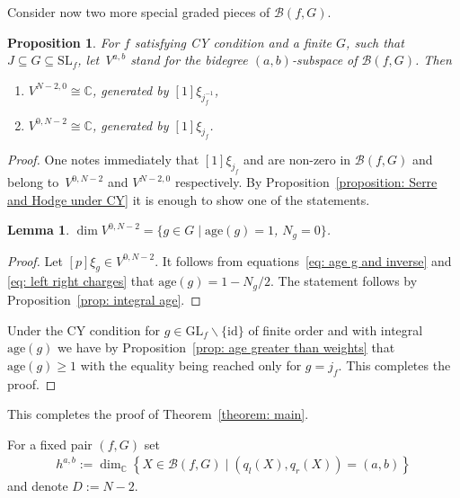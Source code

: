\documentclass[pdftex]{sigma}
\numberwithin{equation}{section}
\newtheorem{Lemma}[Theorem]{Lemma}
\newtheorem{Proposition}[Theorem]{Proposition}
 { \theoremstyle{definition}
\newtheorem{Definition}[Theorem]{Definition}
\newtheorem{Note}[Theorem]{Note}
\newtheorem{Example}[Theorem]{Example}
\newtheorem{Remark}[Theorem]{Remark} }
\newcommand{\CC}{{\mathbb{C}}}
\newcommand{\SL}{{\mathrm{SL}}}
\newcommand{\GL}{{\mathrm{GL}}}
\newcommand{\id}{\mathrm{id}}
\newcommand{\age}{\mathrm{age}}
\def\B{{\mathcal B}}
\begin{document}
Consider now two more special graded pieces of $\B(f,G)$.

\begin{Proposition}\label{proposition: hd0}
	For $f$ satisfying CY condition and a finite $G$, such that $J \subseteq G \subseteq \SL_f$, let~$V^{a,b}$ stand for the bidegree $(a,b)$-subspace of $\B(f,G)$.
	Then
	\begin{enumerate}\itemsep=0pt
	 \item[$(1)$] $V^{N-2,0} \cong \CC$, generated by $[1]\xi_{j_f^{-1}}$,
	 \item[$(2)$] $V^{0,N-2} \cong \CC$, generated by $[1]\xi_{j_f}$.
	\end{enumerate}
\end{Proposition}
\begin{proof}
 One notes immediately that $[1]\xi_{j_f}$ and  are non-zero in $\B(f,G)$ and belong to~$V^{0,N-2}$ and $V^{N-2,0}$ respectively. By Proposition~\ref{proposition: Serre and Hodge under CY} it is enough to show one of the statements.

 \begin{Lemma}
 $\dim V^{0,N-2} = \lbrace g \in G \mid \age(g) = 1$, $ N_g = 0 \rbrace$.
 \end{Lemma}
 \begin{proof}
 Let $[p]\xi_g \in V^{0,N-2}$. It follows from equations~\eqref{eq: age g and inverse} and \eqref{eq: left right charges} that $\age(g) = 1 - N_g/2$. The statement follows by Proposition~\ref{prop: integral age}.
 \end{proof}

 Under the CY condition for $g \in \GL_f \backslash \lbrace \id \rbrace$ of finite order and with integral $\age(g)$ we have by Proposition~\ref{prop: age greater than weights} that $\age(g) \ge 1$ with the equality being reached only for $g = j_f$. This completes the proof.
\end{proof}
This completes the proof of Theorem~\ref{theorem: main}.

For a fixed pair $(f,G)$ set{\samepage
\begin{align*}
	h^{a,b} := \dim_\CC \left\lbrace X \in \B(f,G) \mid (q_l(X),q_r(X)) = (a,b)\right\rbrace
\end{align*}
and denote $D := N-2$.}
\end{document}
